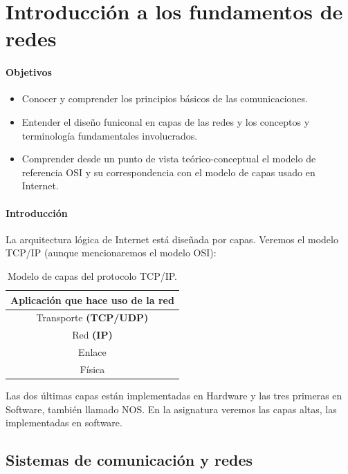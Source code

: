 \chapter{Introducción a los fundamentos de redes}
\subsubsection{Objetivos}
\begin{itemize}
    \item Conocer y comprender los principios básicos de las comunicaciones.
    \item Entender el diseño funiconal en capas de las redes y los conceptos y terminología fundamentales involucrados. 
    \item Comprender desde un punto de vista teórico-conceptual el modelo de referencia OSI y su correspondencia con el modelo de capas usado en Internet.
\end{itemize}

\subsubsection{Introducción}
La arquitectura lógica de Internet está diseñada por capas. Veremos el modelo TCP/IP (aunque mencionaremos el modelo OSI):
\begin{table}[h]
    \centering
    \begin{tabular}{|c|}
        \hline
        Aplicación que hace uso de la red\\ \hline
        Transporte \textbf{(TCP/UDP)} \\ \hline
        Red \textbf{(IP)} \\ \hline
        Enlace \\ \hline
        Física \\ \hline
    \end{tabular}
    \caption{Modelo de capas del protocolo TCP/IP.}
    \label{table:_tabla_de_capas}
\end{table}

Las dos últimas capas están implementadas en Hardware y las tres primeras en Software, también llamado \acrfull{NOS}. En la asignatura veremos las capas altas, las implementadas en software.

\section{Sistemas de comunicación y redes}

